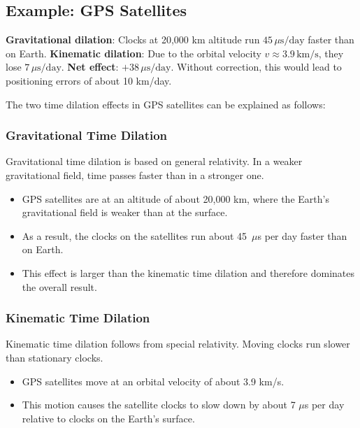 \documentclass[a4paper,12pt]{article}
\begin{document}
	\subsection{Example: GPS Satellites}
	\textbf{Gravitational dilation}: Clocks at 20,000 km altitude run \( 45 \, \mu\text{s/day} \) faster than on Earth. \textbf{Kinematic dilation}: Due to the orbital velocity \( v \approx 3.9 \, \text{km/s} \), they lose \( 7 \, \mu\text{s/day} \). \textbf{Net effect}: \( +38 \, \mu\text{s/day} \). Without correction, this would lead to positioning errors of about 10 km/day.
	
	The two time dilation effects in GPS satellites can be explained as follows:
	
	\subsubsection{Gravitational Time Dilation}
	Gravitational time dilation is based on general relativity. In a weaker gravitational field, time passes faster than in a stronger one.
	\begin{itemize}
		\item GPS satellites are at an altitude of about 20,000 km, where the Earth's gravitational field is weaker than at the surface.
		\item As a result, the clocks on the satellites run about 45~$\mu$s per day faster than on Earth.
		\item This effect is larger than the kinematic time dilation and therefore dominates the overall result.
	\end{itemize}
	
	\subsubsection{Kinematic Time Dilation}
	Kinematic time dilation follows from special relativity. Moving clocks run slower than stationary clocks.
	\begin{itemize}
		\item GPS satellites move at an orbital velocity of about 3.9 km/s.
		\item This motion causes the satellite clocks to slow down by about 7 $\mu$s per day relative to clocks on the Earth's surface.
	\end{itemize}
	
\end{document}
